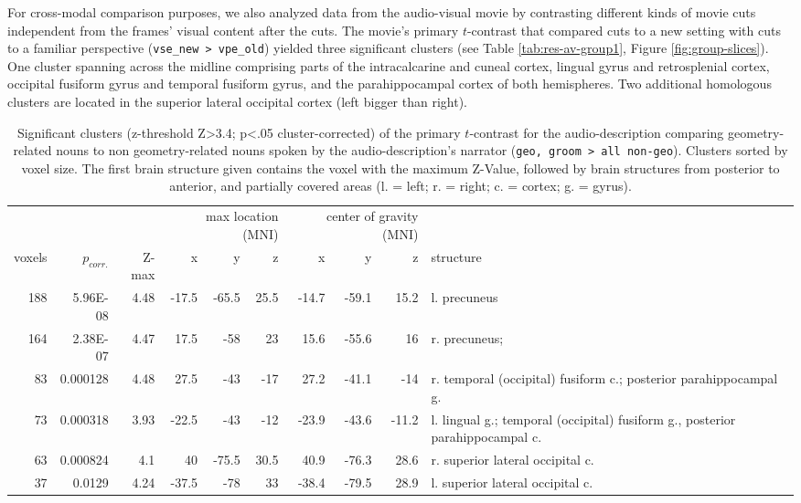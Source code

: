 \documentclass[english]{article}
\begin{document}
For cross-modal comparison purposes, we also analyzed data from the audio-visual
movie by contrasting different kinds of movie cuts independent from the frames'
visual content after the cuts.
The movie's primary $t$-contrast that compared cuts to a new setting with cuts
to a familiar perspective (\texttt{vse\_new > vpe\_old}) yielded three
significant clusters (see Table \ref{tab:res-av-group1}, Figure
\ref{fig:group-slices}).
One cluster spanning across the midline comprising parts of the intracalcarine
and cuneal cortex, lingual gyrus and retrosplenial cortex, occipital fusiform
gyrus and temporal fusiform gyrus, and the parahippocampal cortex of both
hemispheres.
Two additional homologous clusters are located in the superior lateral occipital
cortex (left bigger than right).


\begin{table}[t]
    \caption{Significant clusters (z-threshold Z>3.4; p<.05 cluster-corrected)
        of the primary $t$-contrast for the audio-description comparing
        geometry-related nouns to non geometry-related nouns spoken by the
        audio-description's narrator (\texttt{geo, groom > all non-geo}).
        Clusters sorted by voxel size.
    The first brain structure given contains the voxel with the maximum Z-Value,
followed by brain structures from posterior to anterior, and partially covered
areas (l. = left; r. = right; c. = cortex; g. = gyrus).}
    \label{tab:res-ao-group1}
\begin{tabular}{rrrrrrrrrp{3cm}}
\toprule
& & & \multicolumn{3}{r}{max location (MNI)} & \multicolumn{3}{r}{center of gravity (MNI)} &
\\ \cmidrule{4-6} \cmidrule{7-9}
voxels & $p_{corr.}$ & Z-max & x & y & z  & x & y & z & structure \\
\midrule
188 & 5.96E-08 & 4.48 & -17.5 & -65.5 & 25.5 & -14.7 & -59.1 & 15.2 & l. precuneus \\
164 & 2.38E-07 & 4.47 & 17.5 & -58 & 23 & 15.6 & -55.6 & 16 & r. precuneus; \\
83 & 0.000128 & 4.48 & 27.5 & -43 & -17 & 27.2 & -41.1 & -14 & r. temporal (occipital) fusiform c.; posterior parahippocampal g. \\
73 & 0.000318 & 3.93 & -22.5 & -43 & -12 & -23.9 & -43.6 & -11.2 & l. lingual g.; temporal (occipital) fusiform g., posterior parahippocampal c. \\
63 & 0.000824 & 4.1 & 40 & -75.5 & 30.5 & 40.9 & -76.3 & 28.6 & r. superior lateral occipital c. \\
37 & 0.0129 & 4.24 & -37.5 & -78 & 33 & -38.4 & -79.5 & 28.9 & l. superior lateral occipital c. \\
\bottomrule
\end{tabular}
\end{table}
\end{document}
